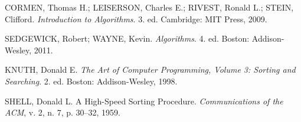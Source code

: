 CORMEN, Thomas H.; LEISERSON, Charles E.; RIVEST, Ronald L.; STEIN,
Clifford. \textit{Introduction to Algorithms}. 3. ed. Cambridge:
MIT Press, 2009.

SEDGEWICK, Robert; WAYNE, Kevin. \textit{Algorithms}. 4. ed.
Boston: Addison-Wesley, 2011.

KNUTH, Donald E. \textit{The Art of Computer Programming, Volume 3:
Sorting and Searching}. 2. ed. Boston: Addison-Wesley, 1998.

SHELL, Donald L. A High-Speed Sorting Procedure. \textit{Communications
of the ACM}, v. 2, n. 7, p. 30–32, 1959.
